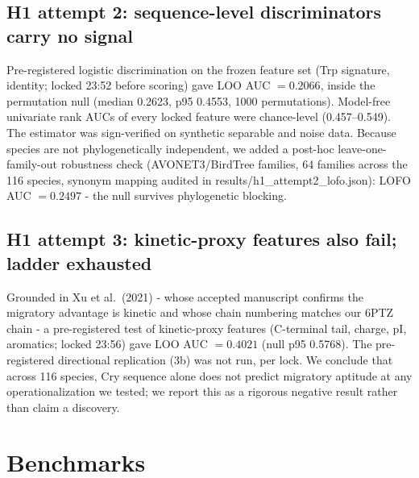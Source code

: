 \documentclass[12pt,a4paper]{article}
\begin{document}
\subsection{H1 attempt 2: sequence-level discriminators carry no signal}
Pre-registered logistic discrimination on the frozen feature set (Trp signature, identity; locked 23:52 before scoring) gave LOO AUC $= 0.2066$, inside the permutation null (median 0.2623, p95 0.4553, 1000 permutations). Model-free univariate rank AUCs of every locked feature were chance-level (0.457--0.549). The estimator was sign-verified on synthetic separable and noise data. Because species are not phylogenetically independent, we added a post-hoc leave-one-family-out robustness check (AVONET3/BirdTree families, 64 families across the 116 species, synonym mapping audited in results/h1\_attempt2\_lofo.json): LOFO AUC $= 0.2497$ - the null survives phylogenetic blocking.

\subsection{H1 attempt 3: kinetic-proxy features also fail; ladder exhausted}
Grounded in Xu et al.\ (2021) - whose accepted manuscript confirms the migratory advantage is kinetic and whose chain numbering matches our 6PTZ chain - a pre-registered test of kinetic-proxy features (C-terminal tail, charge, pI, aromatics; locked 23:56) gave LOO AUC $= 0.4021$ (null p95 0.5768). The pre-registered directional replication (3b) was not run, per lock. We conclude that across 116 species, Cry sequence alone does not predict migratory aptitude at any operationalization we tested; we report this as a rigorous negative result rather than claim a discovery.


\section{Benchmarks}
\end{document}
